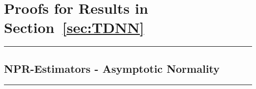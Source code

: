 \section{Proofs for Results in Section~\ref{sec:TDNN}}
\hrule

\subsection{NPR-Estimators - Asymptotic Normality}
\hrule